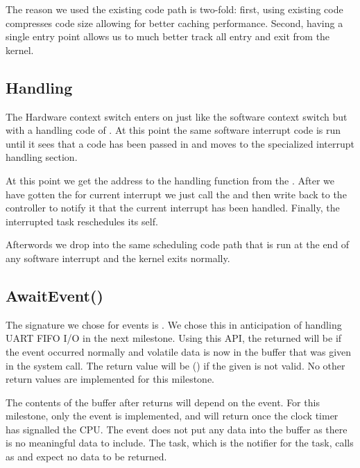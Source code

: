 \documentclass[pdftex,10pt,a4paper]{article}
\begin{document}
The reason we used the existing code path is two-fold: first, using
existing code compresses code size allowing for better caching
performance. Second, having a single entry point allows us to much
better track all entry and exit from the kernel.

\subsection*{Handling}

The Hardware context switch enters on  just
like the software context switch but with a handling code of . At
this point the same software interrupt code is run until it sees that
a code  has been passed in and moves to the specialized
interrupt handling section.

At this point we get the address to the handling function from the
. After we have gotten the  for current
interrupt we just call the  and then write back to the
 controller to notify it that the current interrupt has been
handled. Finally, the interrupted task reschedules its self.

Afterwords we drop into the same scheduling code path that is run at
the end of any software interrupt and the kernel exits normally.

\subsection*{AwaitEvent()}

The signature we chose for events is
. We chose
this in anticipation of handling UART FIFO I/O in the next
milestone. Using this API, the returned  will be  if
the event occurred normally and volatile data is now in the
 buffer that was given in the system call. The return value
will be  () if the given  is
not valid. No other return values are implemented for this milestone.

The contents of the  buffer after  returns
will depend on the event. For this milestone, only the
 event is implemented, and will return once the clock
timer has signalled the CPU. The  event does not put
any data into the  buffer as there is no meaningful data to
include. The  task, which is the notifier for the
 task, calls  as
 and expect no data to be
returned.
\end{document}
